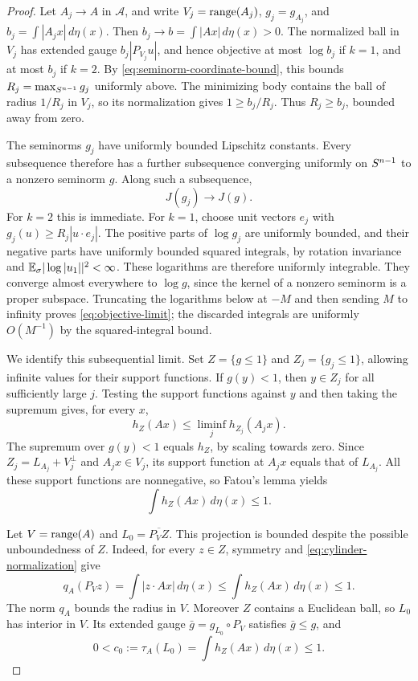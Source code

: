 \begin{proof}
Let $A_j\to A$ in $\mathcal A$, and write
$V_j=\operatorname{range}(A_j)$, $g_j=g_{A_j}$, and
$b_j=\int|A_jx|\,d\eta(x)$. Then
$b_j\to b=\int|Ax|\,d\eta(x)>0$. The normalized ball in $V_j$
has extended gauge $b_j|P_{V_j}u|$, and hence objective at most
$\log b_j$ if $k=1$, and at most $b_j$ if $k=2$.
By \eqref{eq:seminorm-coordinate-bound}, this bounds
$R_j=\max_{S^{n-1}}g_j$ uniformly above. The minimizing body contains
the ball of radius $1/R_j$ in $V_j$, so its normalization gives
$1\ge b_j/R_j$. Thus $R_j\ge b_j$, bounded away from zero.

The seminorms $g_j$ have uniformly bounded Lipschitz constants.
Every subsequence therefore has a further subsequence converging
uniformly on $S^{n-1}$ to a nonzero seminorm $g$. Along such a
subsequence,
\begin{equation}\label{eq:objective-limit}
 J(g_j)\longrightarrow J(g).
\end{equation}
For $k=2$ this is immediate. For $k=1$, choose unit vectors $e_j$
with $g_j(u)\ge R_j|u\cdot e_j|$. The positive parts of $\log g_j$
are uniformly bounded, and their negative parts have uniformly
bounded squared integrals, by rotation invariance and
$\mathbb E_{\sigma}|\log|u_1||^2<\infty$. These logarithms are therefore uniformly
integrable. They converge almost everywhere to $\log g$, since
the kernel of a nonzero seminorm is a proper subspace. Truncating
the logarithms below at $-M$ and then sending $M$ to infinity proves
\eqref{eq:objective-limit}; the discarded integrals are uniformly
$O(M^{-1})$ by the squared-integral bound.

We identify this subsequential limit. Set
$Z=\{g\le1\}$ and $Z_j=\{g_j\le1\}$, allowing infinite values
for their support functions. If $g(y)<1$, then $y\in Z_j$ for all
sufficiently large $j$. Testing the support functions against $y$
and then taking the supremum gives, for every $x$,
\begin{equation}\label{eq:cylinder-support-limit}
 h_Z(Ax)\le\liminf_j h_{Z_j}(A_jx).
\end{equation}
The supremum over $g(y)<1$ equals $h_Z$, by scaling towards zero.
Since $Z_j=L_{A_j}+V_j^\perp$ and $A_jx\in V_j$, its support
function at $A_jx$ equals that of $L_{A_j}$. All these support
functions are nonnegative, so Fatou's lemma yields
\begin{equation}\label{eq:cylinder-normalization}
 \int h_Z(Ax)\,d\eta(x)\le1.
\end{equation}

Let $V=\operatorname{range}(A)$ and $L_0=\overline{P_VZ}$. This projection is
bounded despite the possible unboundedness of $Z$. Indeed, for
every $z\in Z$, symmetry and \eqref{eq:cylinder-normalization} give
\[
 q_A(P_Vz)=\int|z\cdot Ax|\,d\eta(x)
 \le\int h_Z(Ax)\,d\eta(x)\le1.
\]
The norm $q_A$ bounds the radius in $V$. Moreover $Z$ contains a
Euclidean ball, so $L_0$ has interior in $V$. Its extended gauge
$\bar g=g_{L_0}\circ P_V$ satisfies $\bar g\le g$, and
\begin{equation}\label{eq:projected-normalization}
 0<c_0:=\tau_A(L_0)=\int h_Z(Ax)\,d\eta(x)\le1.
\end{equation}


\end{proof}
